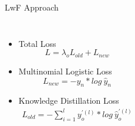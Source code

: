 \documentclass[aspectratio=169, xcolor=dvipsnames]{beamer}
\begin{document}
\begin{frame}{LwF Approach}
\begin{columns}
      \begin{itemize}
      \item Total Loss\\
      \vspace{-0.25cm}
            {\small
            \begin{equation}
            L = \lambda_oL_{old} + L_{new}
            \end{equation}
            }
      \item Multinomial Logistic Loss\\
      \vspace{-0.25cm}
            {\small
            \begin{equation}
            L_{new} = -y_n * log\: \hat{y}_n
            \end{equation}
            }
      \item Knowledge Distillation Loss\\
      \vspace{-0.5cm}
            {\small
            \begin{equation}
            \begin{split}
            L_{old} = - \sum^{l}_{i=1} y^{'(l)}_o * log\: \hat{y}^{'(l)}_o
            \end{split}
            \end{equation}
            }
      \end{itemize}
      \end{columns}
\end{frame}
\end{document}
